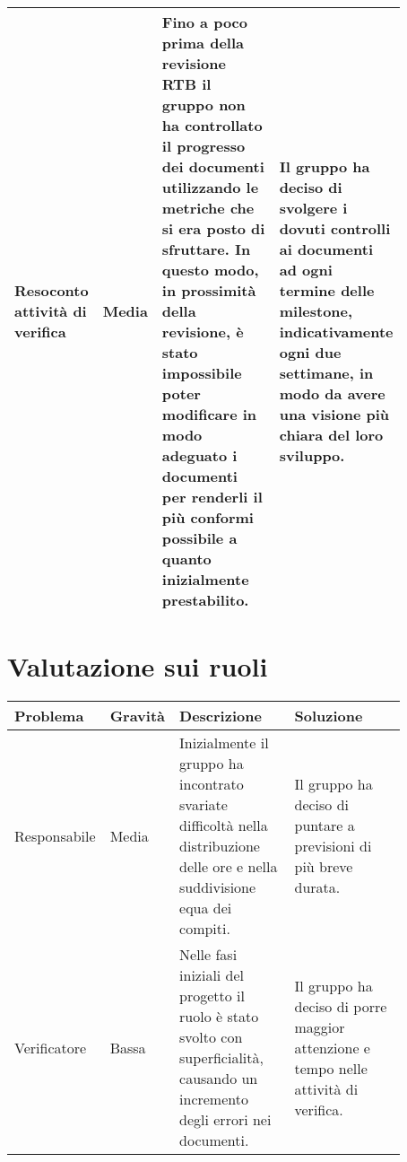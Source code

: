 \begin{longtable}{|p{0.16\linewidth}|p{0.11\linewidth}|p{0.3\linewidth}|p{0.3\linewidth}|}
    \rowcolor[HTML]{C0C0C0}
    Resoconto attività di verifica & Media & Fino a poco prima della revisione RTB il gruppo non ha controllato il progresso dei documenti utilizzando le metriche che si era posto di sfruttare. In questo modo, in prossimità della revisione, è stato impossibile poter modificare in modo adeguato i documenti per renderli il più conformi possibile a quanto inizialmente prestabilito. & Il gruppo ha deciso di svolgere i dovuti controlli ai documenti ad ogni termine delle milestone, indicativamente ogni due settimane, in modo da avere una visione più chiara del loro sviluppo.\\ \hline
    \hline
\end{longtable}



\section{Valutazione sui ruoli}
\begin{table}[H]
    \centering
    \begin{tabular}{|p{0.16\linewidth}|p{0.11\linewidth}|p{0.3\linewidth}|p{0.3\linewidth}|}
   \hline
    \rowcolor[HTML]{036400}
    {\color[HTML]{FFFFFF} \textbf{Problema}} & {\color[HTML]{FFFFFF} \textbf{Gravità}} & {\color[HTML]{FFFFFF} \textbf{Descrizione}} & {\color[HTML]{FFFFFF} \textbf{Soluzione}} \\ \hline
    \rowcolor[HTML]{EFEFEF}
    Responsabile & Media & Inizialmente il gruppo ha incontrato svariate difficoltà nella distribuzione delle ore e nella suddivisione equa dei compiti. & Il gruppo ha deciso di puntare a previsioni di più breve durata. \\ \hline
    \rowcolor[HTML]{C0C0C0}
    Verificatore & Bassa & Nelle fasi iniziali del progetto il ruolo è stato svolto con superficialità, causando un incremento degli errori nei documenti. & Il gruppo ha deciso di porre maggior attenzione e tempo nelle attività di verifica. \\ \hline
    \end{tabular}
\end{table}


